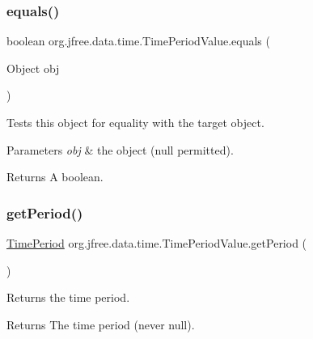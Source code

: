 \subsubsection{\texorpdfstring{equals()}{equals()}}
{\footnotesize\ttfamily boolean org.\+jfree.\+data.\+time.\+Time\+Period\+Value.\+equals (\begin{DoxyParamCaption}\item[{Object}]{obj }\end{DoxyParamCaption})}

Tests this object for equality with the target object.


\begin{DoxyParams}{Parameters}
{\em obj} & the object ({\ttfamily null} permitted).\\
\hline
\end{DoxyParams}
\begin{DoxyReturn}{Returns}
A boolean. 
\end{DoxyReturn}
\mbox{\label{classorg_1_1jfree_1_1data_1_1time_1_1_time_period_value_ac9fdaf9f3edcf0a997615d7f8c2bdd5f}} 
\subsubsection{\texorpdfstring{get\+Period()}{getPeriod()}}
{\footnotesize\ttfamily \mbox{\hyperlink{interfaceorg_1_1jfree_1_1data_1_1time_1_1_time_period}{Time\+Period}} org.\+jfree.\+data.\+time.\+Time\+Period\+Value.\+get\+Period (\begin{DoxyParamCaption}{ }\end{DoxyParamCaption})}

Returns the time period.

\begin{DoxyReturn}{Returns}
The time period (never {\ttfamily null}). 
\end{DoxyReturn}
\mbox{\label{classorg_1_1jfree_1_1data_1_1time_1_1_time_period_value_a8477b0ff36ad1cc849c4c9e551c2037d}} 
